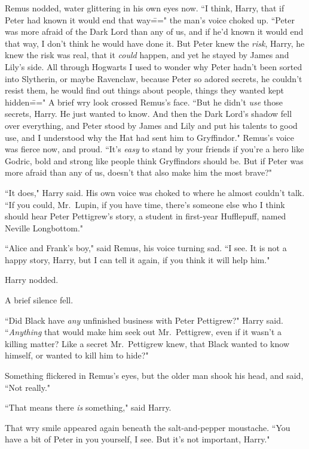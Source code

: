 Remus nodded, water glittering in his own eyes now. ``I think, Harry, that if Peter had known it would end that way\===" the man's voice choked up. ``Peter was more afraid of the Dark Lord than any of us, and if he'd known it would end that way, I don't think he would have done it. But Peter knew the \emph{risk}, Harry, he knew the risk was real, that it \emph{could} happen, and yet he stayed by James and Lily's side. All through Hogwarts I used to wonder why Peter hadn't been sorted into Slytherin, or maybe Ravenclaw, because Peter so adored secrets, he couldn't resist them, he would find out things about people, things they wanted kept hidden\===" A brief wry look crossed Remus's face. ``But he didn't \emph{use} those secrets, Harry. He just wanted to know. And then the Dark Lord's shadow fell over everything, and Peter stood by James and Lily and put his talents to good use, and I understood why the Hat had sent him to Gryffindor." Remus's voice was fierce now, and proud. ``It's \emph{easy} to stand by your friends if you're a hero like Godric, bold and strong like people think Gryffindors should be. But if Peter was more afraid than any of us, doesn't that also make him the most brave?"

``It does," Harry said. His own voice was choked to where he almost couldn't talk. ``If you could, Mr.~Lupin, if you have time, there's someone else who I think should hear Peter Pettigrew's story, a student in first-year Hufflepuff, named Neville Longbottom."

``Alice and Frank's boy," said Remus, his voice turning sad. ``I see. It is not a happy story, Harry, but I can tell it again, if you think it will help him."

Harry nodded.

A brief silence fell.

``Did Black have \emph{any} unfinished business with Peter Pettigrew?" Harry said. ``\emph{Anything} that would make him seek out Mr.~Pettigrew, even if it wasn't a killing matter? Like a secret Mr.~Pettigrew knew, that Black wanted to know himself, or wanted to kill him to hide?"

Something flickered in Remus's eyes, but the older man shook his head, and said, ``Not really."

``That means there \emph{is} something," said Harry.

That wry smile appeared again beneath the salt-and-pepper moustache. ``You have a bit of Peter in you yourself, I see. But it's not important, Harry."

